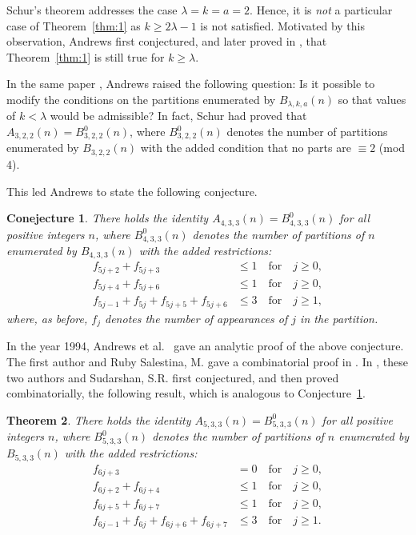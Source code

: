 \documentclass[12pt,twoside]{amsart}
\newtheorem{Theorem}{Theorem}
\newtheorem{Conjecture}[Theorem]{Conejecture}
\theoremstyle{remark}
\numberwithin{equation}{section}
\begin{document}
Schur's theorem \cite{R6} addresses the case $  \lambda = k = a = 2$.
Hence, it is {\it not\/} a particular case of Theorem~\ref{thm:1} as $ k \geq
2\lambda  - 1  $ is not satisfied. Motivated by this observation,
Andrews \cite{R1}
first conjectured, and later proved in \cite{R2}, that Theorem~\ref{thm:1}
is still true for $  k \geq \lambda.$

In the same paper \cite{R2},
Andrews raised the following question: Is it possible to modify the
conditions on the partitions enumerated by $B_{\lambda ,k,a}(n)$ so
that values of $k < \lambda$
would be admissible? In fact, Schur \cite{R6} had proved that
$A_{3,2,2}(n) = B^0_{3,2,2}(n)$,
where $B^0_{3,2,2}(n)$ denotes the number of partitions enumerated by
$B_{3,2,2}(n)$ with the
added condition that no parts are $\equiv 2$ (mod 4).

This led  Andrews \cite{R2} to state the following conjecture.

\begin{Conjecture}\label{conj}
There holds the identity $A_{4,3,3}(n) = B^0_{4,3,3}(n) $ for all
positive  integers $n$,  where $B^0_{4,3,3}(n)$ denotes the
number of partitions of $ n $ enumerated by $B_{4,3,3}(n)$ with
the added restrictions:
\begin{align*}
f_{5j+2} + f_{5j+3} &\leq 1\quad \text{for}\quad j\ge0,\\
f_{5j+4} + f_{5j+6} &\leq 1\quad \text{for}\quad j\ge0,\\
f_{5j-1} + f_{5j} + f_{5j+5} + f_{5j+6} &\leq 3 \quad \text{for}\quad j\ge1,
\end{align*}
where, as before,
$f_{j}$ denotes the number of appearances of $j$ in the
partition.
\end{Conjecture}

In the year 1994, Andrews et al.\ \cite{R3} gave an analytic proof of
the above conjecture. The first
author and Ruby Salestina, M. gave a combinatorial
proof in \cite{R4}. In \cite{R5},
these two authors and Sudarshan, S.R.
first conjectured, and then proved combinatorially, the following result,
which is analogous to Conjecture~\ref{conj}.

\begin{Theorem}\label{thm:2}
There holds the identity $A_{5,3,3}(n) = B^0_{5,3,3}(n) $ for all
positive  integers $n$,  where $B^0_{5,3,3}(n)$ denotes the
number of partitions of $ n $ enumerated by $B_{5,3,3}(n)$ with
the added restrictions:
\begin{align*}
 f_{6j+3} &= 0\quad \text{for}\quad j \geq 0,\\
 f_{6j+2} + f_{6j+4} &\leq 1\quad \text{for}\quad j\ge0,\\
f_{6j+5} + f_{6j+7}&\leq 1\quad \text{for}\quad j\ge0,\\
f_{6j-1} + f_{6j} + f_{6j+6} + f_{6j+7}&\leq 3 \quad \text{for}\quad j\ge1.
\end{align*}
\end{Theorem}
\end{document}
